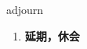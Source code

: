 
\begin{frame}
{\huge adjourn}
\begin{center}
\begin{enumerate}\Large
  \item \textbf{延期，休会}
\end{enumerate}
\end{center}
\end{frame}
